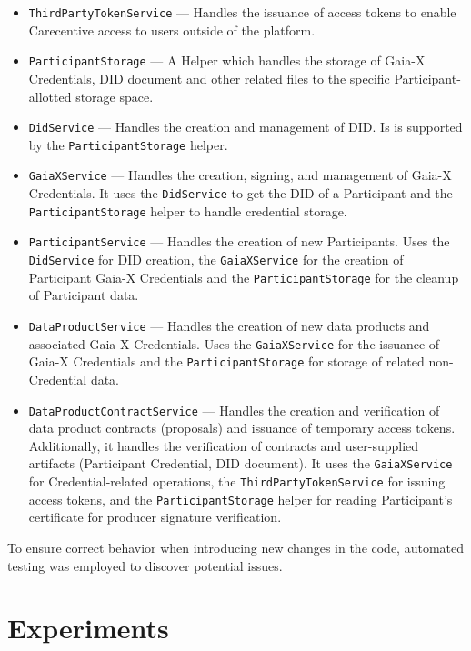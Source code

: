 \begin{itemize}
    \item \texttt{ThirdPartyTokenService} --- Handles the issuance of access tokens to enable Carecentive access to users outside of the platform.
    \item \texttt{ParticipantStorage} --- A Helper which handles the storage of Gaia-X Credentials, DID document and other related files to the specific Participant-allotted storage space.
    \item \texttt{DidService} --- Handles the creation and management of DID.
    Is is supported by the \texttt{ParticipantStorage} helper.
    \item \texttt{GaiaXService} --- Handles the creation, signing, and management of Gaia-X Credentials.
    It uses the \texttt{DidService} to get the DID of a Participant and the \texttt{ParticipantStorage} helper to handle credential storage.
    \item \texttt{ParticipantService} --- Handles the creation of new Participants.
    Uses the \texttt{DidService} for DID creation, the \texttt{GaiaXService} for the creation of Participant Gaia-X Credentials and the \texttt{ParticipantStorage} for the cleanup of Participant data.
    \item \texttt{DataProductService} --- Handles the creation of new data products and associated Gaia-X Credentials.
    Uses the \texttt{GaiaXService} for the issuance of Gaia-X Credentials and the \texttt{ParticipantStorage} for storage of related non-Credential data.
    \item \texttt{DataProductContractService} --- Handles the creation and verification of data product contracts (proposals) and issuance of temporary access tokens.
    Additionally, it handles the verification of contracts and user-supplied artifacts (Participant Credential, DID document).
    It uses the \texttt{GaiaXService} for Credential-related operations, the \texttt{ThirdPartyTokenService} for issuing access tokens, and the \texttt{ParticipantStorage} helper for reading Participant's certificate for producer signature verification.
\end{itemize}

To ensure correct behavior when introducing new changes in the code, automated testing was employed to discover potential issues.

\section{Experiments}\label{sec:experiments}

